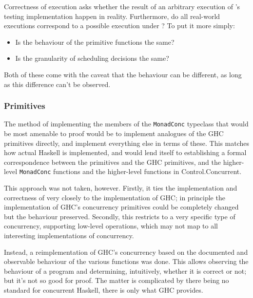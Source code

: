 Correctness of execution asks whether the result of an arbitrary
execution of \dejafu{}'s testing implementation happen in reality.
Furthermore, do all real-world executions correspond to a possible
execution under \dejafu{}? To put it more simply:

\begin{itemize}
\item Is the behaviour of the primitive functions the same?

\item Is the granularity of scheduling decisions the same?
\end{itemize}

Both of these come with the caveat that the behaviour can be
different, as long as this difference can't be observed.

\subsubsection{Primitives}
\label{sec:correctness-execution-primops}

The method of implementing the members of the \verb|MonadConc|
typeclass that would be most amenable to proof would be to implement
analogues of the GHC primitives directly, and implement everything
else in terms of these. This matches how actual Haskell is
implemented, and would lend itself to establishing a formal
correspondence between the \dejafu{} primitives and the GHC
primitives, and the higher-level \verb|MonadConc| functions and the
higher-level functions in Control.\-Concurrent.

This approach was not taken, however. Firstly, it ties the
implementation and correctness of \dejafu{} very closely to the
implementation of GHC; in principle the implementation of GHC's
concurrency primitives could be completely changed but the behaviour
preserved. Secondly, this restricts \dejafu{} to a very specific type
of concurrency, supporting low-level operations, which may not map to
all interesting implementations of concurrency.

Instead, a reimplementation of GHC's concurrency based on the
documented and observable behaviour of the various functions was
done. This allows observing the behaviour of a program and
determining, intuitively, whether it is correct or not; but it's not
so good for proof. The matter is complicated by there being no
standard for concurrent Haskell, there is only what GHC provides.


